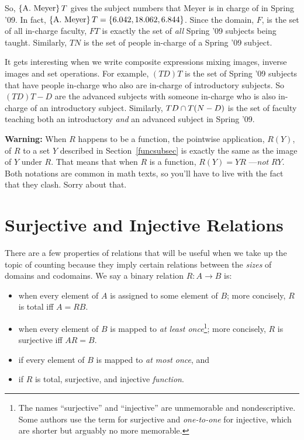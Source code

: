 So, $\left\{\text{A. Meyer}\right\}T$ gives the subject numbers that Meyer is in
charge of in Spring '09.  In fact, $\left\{\text{A. Meyer}\right\}T = \left\{6.042,
  18.062, 6.844\right\}$.  Since the domain, $F$, is the set of all in-charge
faculty, $FT$ is exactly the set of \emph{all} Spring '09 subjects being
taught.  Similarly, $TN$ is the set of people in-charge of a Spring '09
subject.

It gets interesting when we write composite expressions mixing images,
inverse images and set operations.  For example, $(TD)T$ is the set of
Spring '09 subjects that have people in-charge who also are in-charge of
introductory subjects.  So $(TD)T - D$ are the advanced subjects with
someone in-charge who is also in-charge of an introductory subject.
Similarly, $TD \cap T(N-D)$ is the set of faculty teaching both an
introductory \emph{and} an advanced subject in Spring '09.

\textbf{Warning:} When $R$ happens to be a function, the pointwise
application, $R(Y)$, of $R$ to a set $Y$ described in
Section~\ref{funcsubsec} is exactly the same as the image of $Y$ under
$R$.  That means that when $R$ is a function, $R(Y) = YR$ ---\emph{not}
$RY$.  Both notations are common in math texts, so you'll have to live
with the fact that they clash.  Sorry about that.

\section{Surjective and Injective Relations}\label{surj_sec}

There are a few properties of relations that will be useful when we take
up the topic of counting because they imply certain relations between the
\emph{sizes} of domains and codomains.  We say a binary relation $R : A
\to B$ is:

\begin{itemize}

\item {} when every element of $A$ is assigned to some element of
  $B$; more concisely, $R$ is total iff $A=RB$.

\item {} when every element of $B$ is mapped to \textit{at
least once}\footnote{
The names ``surjective'' and ``injective'' are unmemorable and
nondescriptive.  Some authors use the term  for surjective and
\emph{one-to-one} for injective, which are shorter but arguably no more
memorable.}; more concisely, $R$ is surjective iff $AR=B$.

\item {} if every element of $B$ is mapped to \textit{at
most once}, and

\item {} if $R$ is total, surjective, and injective
  \emph{function}.

\end{itemize}

